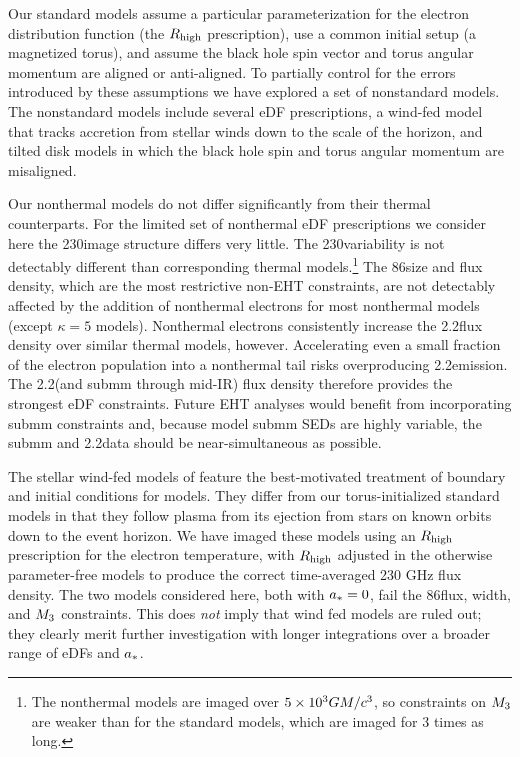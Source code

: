 Our standard models assume a particular parameterization for the electron distribution function (the $R_\mathrm{high}$ prescription), use a common initial setup (a magnetized torus), and assume the black hole spin vector and torus angular momentum are aligned or anti-aligned.  To partially control for the errors introduced by these assumptions we have explored a set of nonstandard models.  The nonstandard models include several eDF prescriptions, a wind-fed model that tracks accretion from stellar winds down to the scale of the horizon, and tilted disk models in which the black hole spin and torus angular momentum are misaligned.

Our nonthermal models do not differ significantly from their thermal counterparts.
For the limited set of nonthermal eDF prescriptions we consider here the 230\GHz image structure differs very little.
The 230\GHz variability is not detectably different than corresponding thermal models.\footnote{The nonthermal models are imaged over $5\times 10^3GM/c^3$, so constraints on $M_{3}$ are weaker than for the standard models, which are imaged for 3 times as long.}
The 86\GHz size and flux density, which are the most restrictive non-EHT constraints, are not detectably affected by the addition of nonthermal electrons for most nonthermal models (except $\kappa = 5$ models).
Nonthermal electrons consistently increase the 2.2\um flux density over similar thermal models, however.
Accelerating even a small fraction of the electron population into a nonthermal tail risks overproducing 2.2\um emission.
The 2.2\um (and submm through mid-IR) flux density therefore provides the strongest eDF constraints.
Future EHT analyses would benefit from incorporating submm constraints \citep[e.g.][]{2019ApJ...881L...2B} and, because model submm SEDs are highly variable, the submm and 2.2\um data should be near-simultaneous as possible.

The stellar wind-fed models of \cite{2020ApJ...896L...6R} feature the best-motivated treatment of boundary and initial conditions for \sgra models.  They differ from our torus-initialized standard models in that they follow plasma from its ejection from stars on known orbits down to the event horizon.  We have imaged these models using an $R_\mathrm{high}$ prescription for the electron temperature, with $R_\mathrm{high}$ adjusted in the otherwise parameter-free models to produce the correct time-averaged 230 GHz flux density.  The two models considered here, both with $a_* = 0$, fail the 86\GHz flux, \mring width, and $M_{3}$ constraints.  This does {\em not} imply that wind fed models are ruled out; they clearly merit further investigation with longer integrations over a broader range of eDFs and $a_*$.

